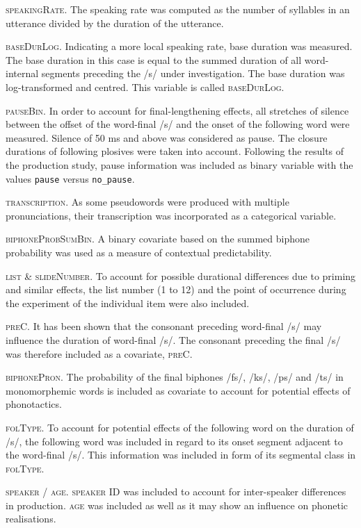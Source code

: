 \textsc{speakingRate}. The speaking rate was computed as the number of syllables in an utterance divided by the duration of the utterance.

\textsc{baseDurLog}. Indicating a more local speaking rate, base duration was measured. The base duration in this case is equal to the summed duration of all word-internal segments preceding the /s/ under investigation. The base duration was log-transformed and centred. This variable is called \textsc{baseDurLog}.

\textsc{pauseBin}. In order to account for final-lengthening effects, all stretches of silence between the offset of the word-final /s/ and the onset of the following word were measured. Silence of 50 ms and above was considered as pause. The closure durations of following plosives were taken into account. Following the results of the production study, pause information was included as binary variable with the values \texttt{pause} versus \texttt{no\_pause}.

\textsc{transcription}. As some pseudowords were produced with multiple pronunciations, their transcription was incorporated as a categorical variable.

\textsc{biphoneProbSumBin}. A binary covariate based on the summed biphone probability was used as a measure of contextual predictability.

\textsc{list} \& \textsc{slideNumber}. To account for possible durational differences due to priming and similar effects, the list number (1 to 12) and the point of occurrence during the experiment of the individual item were also included.

\textsc{preC}. It has been shown that the consonant preceding word-final /s/ may influence the duration of word-final /s/. The consonant preceding the final /s/ was therefore included as a covariate, \textsc{preC}.

\textsc{biphonePron}. The probability of the final biphones /fs/, /ks/, /ps/ and /ts/ in monomorphemic words is included as covariate to account for potential effects of phonotactics.

\textsc{folType}. To account for potential effects of the following word on the duration of /s/, the following word was included in regard to its onset segment adjacent to the word-final /s/. This information was included in form of its segmental class in \textsc{folType}.

\textsc{speaker} / \textsc{age}. \textsc{speaker} ID was included to account for inter-speaker differences in production. \textsc{age} was included as well as it may show an influence on phonetic realisations.

